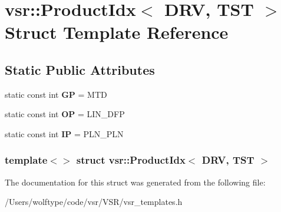 \hypertarget{structvsr_1_1_product_idx_3_01_d_r_v_00_01_t_s_t_01_4}{\section{vsr\-:\-:Product\-Idx$<$ D\-R\-V, T\-S\-T $>$ Struct Template Reference}
\label{structvsr_1_1_product_idx_3_01_d_r_v_00_01_t_s_t_01_4}
}
\subsection*{Static Public Attributes}
\begin{DoxyCompactItemize}
\item 
\hypertarget{structvsr_1_1_product_idx_3_01_d_r_v_00_01_t_s_t_01_4_ac3fc51623f73f1a5b2d5f50065705937}{static const int {\bfseries G\-P} = M\-T\-D}\label{structvsr_1_1_product_idx_3_01_d_r_v_00_01_t_s_t_01_4_ac3fc51623f73f1a5b2d5f50065705937}

\item 
\hypertarget{structvsr_1_1_product_idx_3_01_d_r_v_00_01_t_s_t_01_4_af6ae6dbba7c9f7e1d5c35f5a76c88644}{static const int {\bfseries O\-P} = L\-I\-N\-\_\-\-D\-F\-P}\label{structvsr_1_1_product_idx_3_01_d_r_v_00_01_t_s_t_01_4_af6ae6dbba7c9f7e1d5c35f5a76c88644}

\item 
\hypertarget{structvsr_1_1_product_idx_3_01_d_r_v_00_01_t_s_t_01_4_a500851ced9a82741e2ee3ea507bb2007}{static const int {\bfseries I\-P} = P\-L\-N\-\_\-\-P\-L\-N}\label{structvsr_1_1_product_idx_3_01_d_r_v_00_01_t_s_t_01_4_a500851ced9a82741e2ee3ea507bb2007}

\end{DoxyCompactItemize}
\subsubsection*{template$<$$>$ struct vsr\-::\-Product\-Idx$<$ D\-R\-V, T\-S\-T $>$}



The documentation for this struct was generated from the following file\-:\begin{DoxyCompactItemize}
\item 
/\-Users/wolftype/code/vsr/\-V\-S\-R/vsr\-\_\-templates.\-h\end{DoxyCompactItemize}
